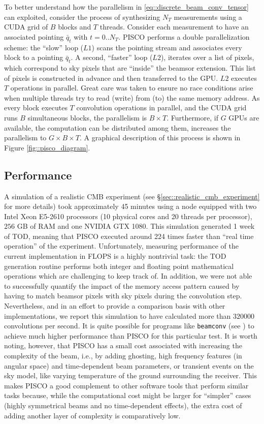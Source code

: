 \documentclass[a4paper,11pt]{article}
\begin{document}
To better understand how the parallelism in \ref{eq::discrete_beam_conv_tensor} can exploited, consider the process of synthesizing $N_T$ measurements using a CUDA grid of $B$ blocks and $T$ threads. Consider each measurement to have an associated pointing $\bar{q}_t$ with $t=0..N_T$. PISCO performs a double parallelization scheme: the ``slow'' loop ($L1$) scans the pointing stream and associates every block to a pointing $\bar{q}_t$. A second, ``faster'' loop ($L2$), iterates over a list of pixels, which correspond to sky pixels that are ``inside'' the beamsor extension. This list of pixels is constructed in advance and then transferred to the GPU. $L2$ executes $T$ operations in parallel. Great care was taken to ensure no race conditions arise when multiple threads try to read (write) from (to) the same memory address. As every block executes $T$ convolution operations in parallel, and the CUDA grid runs $B$ simultaneous blocks, the parallelism is $B \times T$. Furthermore, if $G$ GPUs are available, the computation can be distributed among them, increases the parallelism to $G \times B \times T$. A graphical description of this process is shown in Figure \ref{fig::pisco_diagram}.

\subsection{Performance}

A simulation of a realistic CMB experiment (see \S\ref{sec::realistic_cmb_experiment} for more details) took approximately 45 minutes using a node equipped with two Intel Xeon E5-2610 processors (10 physical cores and 20 threads per processor), $256$ GB of RAM and one NVIDIA GTX 1080. This simulation generated 1 week of TOD, meaning that PISCO executed around 224 times faster than ``real time operation'' of the experiment. Unfortunately, measuring performance of the current implementation in FLOPS is a highly nontrivial task: the TOD generation routine performs both integer and floating point mathematical operations which are challenging to keep track of. In addition, we were not able to successfully quantify the impact of the memory access pattern caused by having to match beamsor pixels with sky pixels during the convolution step. Nevertheless, and in an effort to provide a comparison basis with other implementations, we report this simulation to have calculated more than $320000$ convolutions per second. It is quite possible for programs like \texttt{beamconv} (see \cite{2018arXiv180905034D}) to achieve much higher performance than PISCO for this particular test. It is worth noting, however, that PISCO has a small cost associated with increasing the complexity of the beam, i.e., by adding ghosting, high frequency features (in angular space) and time-dependent beam parameters, or transient events on the sky model, like varying temperature of the ground surrounding the receiver. This makes PISCO a good complement to other software tools that perform similar tasks because, while the computational cost might be larger for ``simpler'' cases (highly symmetrical beams and no time-dependent effects), the extra cost of adding another layer of complexity is comparatively low. 
\end{document}
